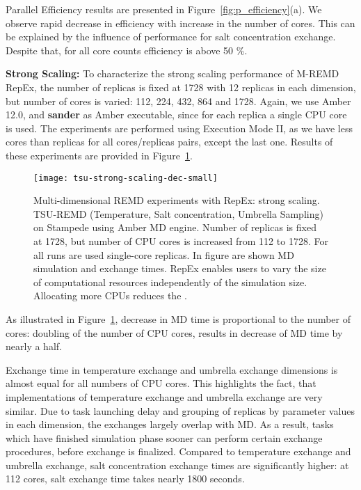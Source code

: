 \documentclass{sig-alternate-05-2015}
\begin{document}
Parallel Efficiency results are presented in Figure~\ref{fig:p_efficiency}(a). We observe rapid decrease in efficiency with increase in the number of cores. This can be explained by the influence of performance for salt concentration exchange. Despite that, for all core counts efficiency is above 50 \%.

{\bf Strong Scaling:}  To characterize the strong scaling performance of M-REMD RepEx, the number of replicas is fixed at 1728 with 12 replicas in each dimension, but number of cores is varied: 112, 224, 432, 864 and 1728. Again, we use Amber 12.0, and \textbf{sander} as Amber executable, since for each replica a single CPU core is used.  The experiments are performed using Execution Mode II, as we have less cores than replicas for all cores/replicas pairs, except the last one. Results of these experiments are provided in Figure~\ref{fig:tsu_strong}.

\begin{figure}[ht!]
\centering
\texttt{[image: tsu-strong-scaling-dec-small]}
\caption{\small{Multi-dimensional REMD experiments with RepEx: strong scaling. TSU-REMD (Temperature, Salt concentration, Umbrella Sampling) on Stampede using Amber MD engine. Number of replicas is fixed at 1728, but number of CPU cores is increased from 112 to 1728. For all runs are used single-core replicas. In figure are shown MD simulation and exchange times. RepEx enables users to vary the size of computational resources independently of the simulation size. Allocating more CPUs reduces the .}    
}
\label{fig:tsu_strong}
\end{figure}

As illustrated in Figure~\ref{fig:tsu_strong}, decrease in MD time is proportional to the number of cores: doubling of the number of CPU cores, results in decrease of MD time by nearly a half.

Exchange time in temperature exchange and umbrella exchange dimensions is almost equal for all numbers of CPU cores. This highlights the fact, that implementations of temperature exchange and umbrella exchange are very similar. Due to task launching delay and grouping of replicas by parameter values in each dimension, the exchanges largely overlap with MD. As a result, tasks which have finished simulation phase sooner can perform certain exchange procedures, before exchange is finalized. Compared to temperature exchange and umbrella exchange, salt concentration exchange times are significantly higher: at 112 cores, salt exchange time takes nearly 1800 seconds.
\end{document}
